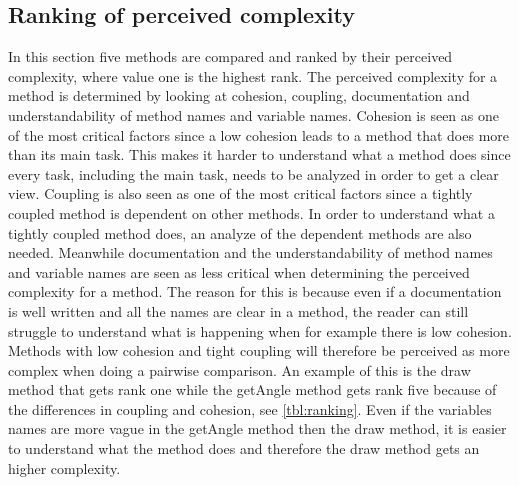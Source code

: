 \documentclass[conference]{IEEEtran}
\newcommand{\lref}[1]{listing \ref{#1}}%
\begin{document}
\subsection{Ranking of perceived complexity}
\label{ssec:ranking}
In this section five methods are compared and ranked by their perceived complexity, where value one is the highest rank. The perceived complexity for a method is determined by looking at cohesion, coupling, documentation and understandability of method names and variable names. Cohesion is seen as one of the most critical factors since a low cohesion leads to a method that does more than its main task. This makes it harder to understand what a method does since every task, including the main task, needs to be analyzed in order to get a clear view. Coupling is also seen as one of the most critical factors since a tightly coupled method is dependent on other methods. In order to understand what a tightly coupled method does, an analyze of the dependent methods are also needed. Meanwhile documentation and the understandability of method names and variable names are seen as less critical when determining the perceived complexity for a method. The reason for this is because even if a documentation is well written and all the names are clear in a method, the reader can still struggle to understand what is happening when for example there is low cohesion. Methods with low cohesion and tight coupling will therefore be perceived as more complex when doing a pairwise comparison. An example of this is the draw method that gets rank one while the getAngle method gets rank five because of the differences in coupling and cohesion, see \cref{tbl:ranking}. Even if the variables names are more vague in the getAngle method then the draw method, it is easier to understand what the method does and therefore the draw method gets an higher complexity. 

\end{document}
